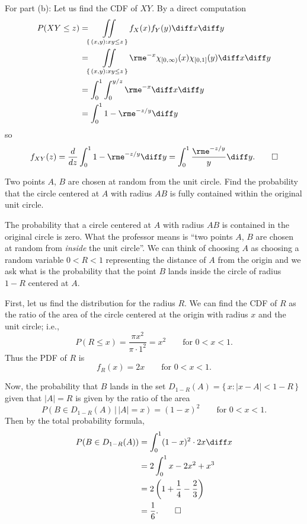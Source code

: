 \begin{solution}
  For part (b): Let us find the CDF of \(XY\). By a direct computation
  \begin{align*}
    P(XY\leq z)
    &=\iint\limits_{\{\,(x,y):xy\leq z\,\}} f_X(x)f_Y(y)\diff x\diff y\\
    &=\iint\limits_{\{\,(x,y):xy\leq z\,\}} \rme^{-x}\chi_{[0,\infty)}(x)\chi_{[0,1]}(y)
      \diff x\diff y\\
    &=\int_0^1\int_0^{y/z}\rme^{-x}\diff x\diff y\\
    &=\int_0^1 1-\rme^{-z/y}\diff y
  \end{align*}
  so
  \[
    f_{XY}(z)=\frac{d}{dz}\int_0^1 1-\rme^{-z/y}\diff
    y=\int_0^1\frac{\rme^{-z/y}}{y}\diff y.\qedhere
  \]
\end{solution}
\newpage

\begin{problem}[Handout 17, \# 18]
  Two points \(A\), \(B\) are chosen at random from the unit circle. Find
  the probability that the circle centered at \(A\) with radius \(AB\) is
  fully contained within the original unit circle.
\end{problem}
\begin{solution}
  The probability that a circle centered at \(A\) with radius \(AB\) is
  contained in the original circle is zero. What the professor means is
  ``two points \(A\), \(B\) are chosen at random from \emph{inside} the
  unit circle''. We can think of choosing \(A\) as choosing a random
  variable \(0<R<1\) representing the distance of \(A\) from the origin and
  we ask what is the probability that the point \(B\) lands inside the
  circle of radius \(1-R\) centered at \(A\).

  First, let us find the distribution for the radius \(R\). We can find the
  CDF of \(R\) as the ratio of the area of the circle centered at the
  origin with radius \(x\) and the unit circle; i.e.,
  \[
    P(R\leq x)=\frac{\pi x^2}{\pi\cdot 1^2}=x^2\qquad \text{for \(0<x<1\).}
  \]
  Thus the PDF of \(R\) is
  \[
    f_R(x)=2x\qquad\text{for \(0<x<1\).}
  \]

  Now, the probability that \(B\) lands in the set
  \(D_{1-R}(A)=\{\,x:|x-A|<1-R\,\}\) given that \(|A|=R\) is given by the
  ratio of the area
  \[
    P(B\in D_{1-R}(A)\,|\,|A|=x)=(1-x)^2\qquad\text{for \(0<x<1\).}
  \]
  Then by the total probability formula,
  \begin{align*}
    P(B\in D_{1-R}(A))
    &=\int_0^1 (1-x)^2\cdot 2x\diff x\\
    &=2\int_0^1 x-2x^2+x^3\\
    &=2\left(1+\frac{1}{4}-\frac{2}{3}\right)\\
    &=\frac{1}{6}.\qedhere
  \end{align*}
\end{solution}
\newpage

